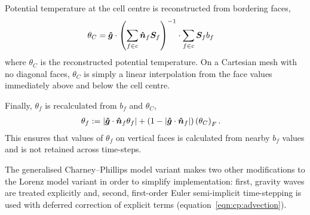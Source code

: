 Potential temperature at the cell centre is reconstructed from bordering faces,
\begin{align}
	\theta_C &= \bm{\hat{g}} \cdot \left( \sum_{f \in c} \bm{\hat{n}}_f \bm{S}_f \right)^{-1} \cdot \sum_{f \in c} \bm{S}_f b_f \label{eqn:cp:reconstruct}
\end{align}
where $\theta_C$ is the reconstructed potential temperature.  On a Cartesian mesh with no diagonal faces, $\theta_C$ is simply a linear interpolation from the face values immediately above and below the cell centre.

Finally, $\theta_f$ is recalculated from $b_f$ and $\theta_C$,
\begin{align}
	\theta_f &:= \left\lvert  \bm{\hat{g}} \cdot \bm{\hat{n}}_f \theta_f \right\rvert + \left( 1 - \left\lvert \bm{\hat{g}} \cdot \bm{\hat{n}}_f  \right\rvert \right) \left( \theta_C \right)_F \text{.}
\end{align}
This ensures that values of $\theta_f$ on vertical faces is calculated from nearby $b_f$ values and is not retained across time-steps.

The generalised Charney--Phillips model variant makes two other modifications to the Lorenz model variant in order to simplify implementation: first, gravity waves are treated explicitly and, second, first-order Euler semi-implicit time-stepping is used with deferred correction of explicit terms (equation~\ref{eqn:cp:advection}).

